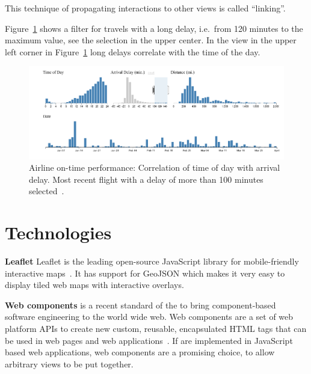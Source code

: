 This technique of propagating interactions to other views is called ``linking''.

Figure~\ref{fig:research:brushing-linking} shows a filter for travels with a long delay, i.e.\ from 120 minutes to the maximum value, see the selection in the upper center.
In the view in the upper left corner in Figure~\ref{fig:research:brushing-linking} long delays correlate with the time of the day.

\begin{figure}
  \centering
  \includegraphics[width=\textwidth]{figures/related-work/brushing_linking}
  \caption{Airline on-time performance: Correlation of time of day with arrival delay. Most recent flight with a delay of more than 100 minutes selected~\parencite{Bostock2017}.}
  \label{fig:research:brushing-linking}
\end{figure}

\section{Technologies}


\textbf{Leaflet}
Leaflet is the leading open-source JavaScript library for mobile-friendly interactive maps~\parencite{Leaflet2017}.
It has support for GeoJSON which makes it very easy to display tiled web maps with interactive overlays.

\textbf{Web components} is a recent standard of the \textcite{W3C2017} to bring component-based software engineering to the world wide web.
Web components are a set of web platform APIs to create new custom, reusable, encapsulated HTML tags that can be used in web pages and web applications~\parencite{WebComponents2017}.
If \cmvs{} are implemented in JavaScript based web applications, web components are a promising choice, to allow arbitrary views to be put together.


